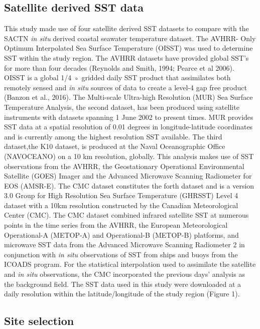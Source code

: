 \documentclass[12pt,A4paper,]{article}
\begin{document}
\subsection{Satellite derived SST
data}\label{satellite-derived-sst-data}

This study made use of four satellite derived SST datasets to compare
with the SACTN \emph{in situ} derived coastal seawater temperature
dataset. The AVHRR- Only Optimum Interpolated Sea Surface Temperature
(OISST) was used to determine SST within the study region. The AVHRR
datasets have provided global SST's for more than four decades (Reynolds
and Smith, 1994; Pearce et al 2006). OISST is a global 1/4 ◦ gridded
daily SST product that assimilates both remotely sensed and \emph{in
situ} sources of data to create a level-4 gap free product (Banzon et
al., 2016). The Multi-scale Ultra-high Resolution (MUR) Sea Surface
Temperature Analysis, the second dataset, has been produced using
satellite instruments with datasets spanning 1 June 2002 to present
times. MUR provides SST data at a spatial resolution of 0.01 degrees in
longitude-latitude coordinates and is currently among the highest
resolution SST available. The third dataset,the K10 dataset, is produced
at the Naval Oceanographic Office (NAVOCEANO) on a 10 km resolution,
globally. This analysis makes use of SST observations from the AVHRR,
the Geostationary Operational Environmental Satellite (GOES) Imager and
the Advanced Microwave Scanning Radiometer for EOS (AMSR-E). The CMC
dataset constitutes the forth dataset and is a version 3.0 Group for
High Resolution Sea Surface Temperature (GHRSST) Level 4 dataset with a
10km resolution constructed by the Canadian Meteorological Center (CMC).
The CMC dataset combined infrared satellite SST at numerous points in
the time series from the AVHRR, the European Meteorological
Operational-A (METOP-A) and Operational-B (METOP-B) platforms, and
microwave SST data from the Advanced Microwave Scanning Radiometer 2 in
conjunction with \emph{in situ} observations of SST from ships and buoys
from the ICOADS program. For the statistical interpolation used to
assimilate the satellite and \emph{in situ} observations, the CMC
incorporated the previous days' analysis as the background field. The
SST data used in this study were downloaded at a daily resolution within
the latitude/longitude of the study region (Figure 1).

\subsection{Site selection}\label{site-selection}
\end{document}
